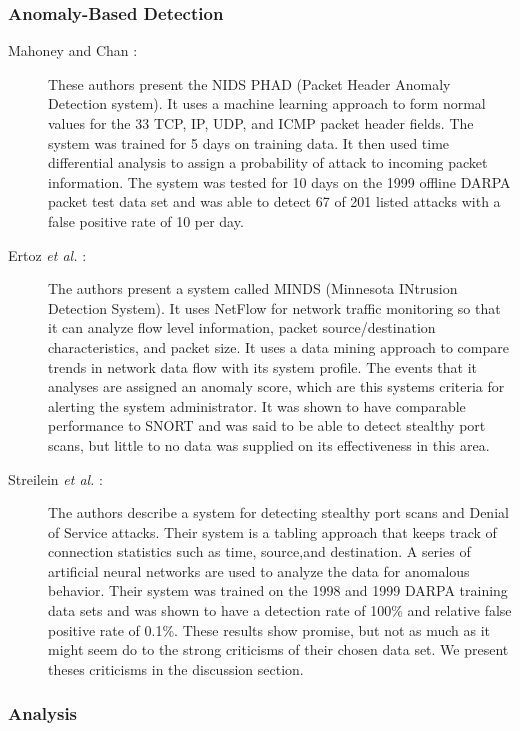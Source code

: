 \documentclass{acm_proc_article-sp}
\begin{document}
		\subsubsection{Anomaly-Based Detection}
		\begin{description}
			\item[Mahoney and Chan \cite{Mahoney2001}:]
				These authors present the NIDS PHAD (Packet Header Anomaly Detection system). It uses a machine learning approach to form normal values for the 33 TCP, IP, UDP, and ICMP packet header fields. The system was trained for 5 days on training data. It then used time differential analysis to assign a probability of attack to incoming packet information. The system was tested for 10 days on the 1999 offline DARPA packet test data set and was able to detect 67 of 201 listed attacks with a false positive rate of 10 per day.
			\item[Ertoz \emph{et al.} \cite{Ertoz2003}:]
				The authors present a system called MINDS (Minnesota INtrusion Detection System). It uses NetFlow for network traffic monitoring so that it can analyze flow level information, packet source/destination characteristics, and packet size. It uses a data mining approach to compare trends in network data flow with its system profile. The events that it analyses are assigned an anomaly score, which are this systems criteria for alerting the system administrator. It was shown to have comparable performance to SNORT and was said to be able to detect stealthy port scans, but little to no data was supplied on its effectiveness in this area.
			\item[Streilein \emph{et al.} \cite{Attacks2002}:]
			The authors describe a system for detecting stealthy port scans and Denial of Service attacks. Their system is a tabling approach that keeps track of connection statistics such as time, source,and  destination. A series of artificial neural networks are used to analyze the data for anomalous behavior. Their system was trained on the 1998 and 1999 DARPA training data sets and was shown to have a detection rate of 100\% and relative false positive rate of 0.1\%. These results show promise, but not as much as it might seem do to the strong criticisms of their chosen data set. We present theses criticisms in the discussion section. 			
		\end{description}
		
		\subsubsection{Analysis}
\end{document}
